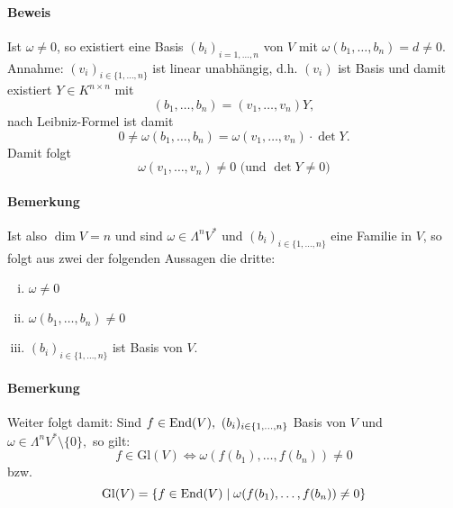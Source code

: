  	\paragraph{Beweis}
 		Ist $ \omega\neq 0 $, so existiert eine Basis $ (b_i)_{i=1,\dots,n} $ von $ V $ mit $ \omega(b_1,\dots,b_n)=d\neq 0 $.
 		Annahme: $ (v_i)_{i\in \{1,\dots,n\}} $ ist linear unabhängig, d.h. $ (v_i) $ ist Basis und damit existiert $ Y\in K^{n\times n} $ mit
 		\[
 			(b_1,\dots,b_n)=(v_1,\dots,v_n)Y,
 		\]
 		nach Leibniz-Formel ist damit
 		\[
 			0\neq \omega(b_1,\dots,b_n)=\omega(v_1,\dots,v_n)\cdot \det Y.
 		\]
 		Damit folgt
 		\[
 			\omega(v_1,\dots,v_n)\neq 0 \text{ (und }\det Y \neq 0)
 		\]

 	\paragraph{Bemerkung}
 		Ist also $ \dim V=n $ und sind $ \omega\in \Lambda^nV^* $ und $ (b_i)_{i\in \{1,\dots,n\}} $ eine Familie in $ V $, so folgt aus zwei der folgenden Aussagen die dritte:
 		\begin{enumerate}[(i)]
 			\item $ \omega\neq 0 $
 			\item $ \omega(b_1,\dots,b_n)\neq 0 $
 			\item $ (b_i)_{i\in\{1,\dots,n\}} $ ist Basis von $ V $.
 		\end{enumerate}
 	\paragraph{Bemerkung}
 		Weiter folgt damit: Sind $ f\in \End(V),\ (b_i)_{i\in \{1,\dots,n\}} $ Basis von $ V $ und $ \omega\in \Lambda^nV^*\setminus\{0\}, $ so gilt:
 		\[
 			f\in \mathrm{Gl}(V)\Leftrightarrow \omega(f(b_1),\dots,f(b_n))\neq 0
 		\]
 		bzw.
 		\[
 			\mathrm{Gl}(V)=\{f\in \operatorname{End}(V)\mid \omega(f(b_1),\dots,f(b_n))\neq 0\}
 		\]
